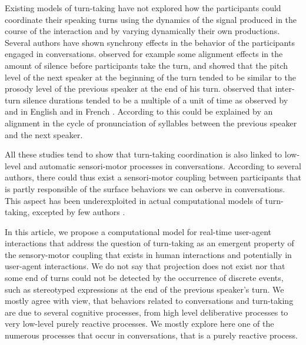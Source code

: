 
Existing models of turn-taking have not explored how the participants could coordinate their speaking turns using the dynamics of the signal produced in the course of the interaction and by varying dynamically their own productions. 
Several authors have shown synchrony effects in the behavior of the participants engaged in conversations. \cite{benus_pragmatic_2011} observed for example some alignment effects in the amount of silence before participants take the turn, and  showed that the pitch level of the next speaker at the beginning of the turn tended to be similar to the prosody level of the previous speaker at the end of his turn. 
\cite{wilson_oscillator_2005} observed that inter-turn silence durations tended to be a multiple of a unit of time as observed by \citep{mcfarland_respiratory_2001} and \citep{wilson_structure_1986} in English and in French \citep{bailly_pauses_2012}. According to \citep{wilson_oscillator_2005} this could be explained by an alignment in the cycle of pronunciation of syllables between the previous speaker and the next speaker. 

All these studies tend to show that turn-taking coordination is also linked to low-level and automatic sensori-motor processes in conversations. According to several authors, there could thus exist a sensori-motor coupling between participants that is partly responsible of the surface behaviors we can osberve in conversations. This aspect has been underexploited in actual computational models of turn-taking, excepted by few authors \citep{ikegami_turn-taking_2007,bonaiuto_towards_2008}. 


In this article, we propose a computational model for real-time user-agent interactions that address the question of turn-taking as an emergent property of the sensory-motor coupling that exists in human interactions and potentially in user-agent interactions. 
We do not say that projection does not exist nor that some end of turns could not be detected by the occurrence of discrete events, such as stereotyped expressions \citep{duncan_signals_1972,gravano_turn-taking_2011} at the end of the previous speaker's turn. We mostly agree with \citep{thorisson_modeling_2008} view, that behaviors related to conversations and turn-taking are due to several cognitive processes, from high level deliberative processes to very low-level purely reactive processes. We mostly explore here one of the numerous processes that occur in conversations, that is a purely reactive process.

